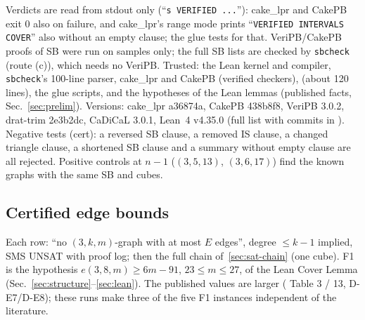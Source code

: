 Verdicts are read from stdout only (``\texttt{s VERIFIED ...}''): cake\_lpr and CakePB exit 0 also on failure, and
cake\_lpr's range mode prints ``\texttt{VERIFIED INTERVALS COVER}'' also without an empty clause; the glue tests for that.
VeriPB/CakePB proofs of SB were run on samples only; the full SB lists are checked by \texttt{sbcheck} (route (c)),
which needs no VeriPB. Trusted: the Lean kernel and compiler, \texttt{sbcheck}'s 100-line parser, cake\_lpr and CakePB
(verified checkers),  (about 120 lines), the glue scripts, and the hypotheses of the Lean lemmas
(published facts, Sec.~\ref{sec:prelim}). Versions: cake\_lpr a36874a, CakePB 438b8f8, VeriPB 3.0.2, drat-trim 2e3b2dc, CaDiCaL 3.0.1, Lean~4 v4.35.0
(full list with commits in ).
Negative tests (cert): a reversed SB clause, a removed IS clause, a changed triangle clause, a shortened
SB clause and a summary without empty clause are all rejected. Positive controls at $n - 1$ ($(3,5,13)$, $(3,6,17)$)
find the known graphs with the same SB and cubes.

\subsection{Certified edge bounds}\label{sec:sat-edge}
Each row: ``no $(3,k,m)$-graph with at most $E$ edges'', degree $\le k-1$ implied, SMS UNSAT with proof log; then
the full chain of~\ref{sec:sat-chain} (one cube). F1 is the hypothesis $e(3,8,m) \ge 6m - 91$, $23 \le m \le 27$, of the Lean Cover
Lemma (Sec.~\ref{sec:structure}--\ref{sec:lean}). The published values are larger (\cite{GR} Table 3 / 13, D-E7/D-E8); these runs make three of
the five F1 instances independent of the literature.

